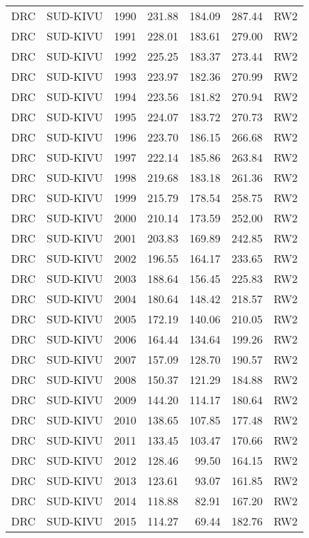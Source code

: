 \begin{longtable}{lllrrrl}
  DRC & SUD-KIVU & 1990 & 231.88 & 184.09 & 287.44 & RW2 \\ 
  DRC & SUD-KIVU & 1991 & 228.01 & 183.61 & 279.00 & RW2 \\ 
  DRC & SUD-KIVU & 1992 & 225.25 & 183.37 & 273.44 & RW2 \\ 
  DRC & SUD-KIVU & 1993 & 223.97 & 182.36 & 270.99 & RW2 \\ 
  DRC & SUD-KIVU & 1994 & 223.56 & 181.82 & 270.94 & RW2 \\ 
  DRC & SUD-KIVU & 1995 & 224.07 & 183.72 & 270.73 & RW2 \\ 
  DRC & SUD-KIVU & 1996 & 223.70 & 186.15 & 266.68 & RW2 \\ 
  DRC & SUD-KIVU & 1997 & 222.14 & 185.86 & 263.84 & RW2 \\ 
  DRC & SUD-KIVU & 1998 & 219.68 & 183.18 & 261.36 & RW2 \\ 
  DRC & SUD-KIVU & 1999 & 215.79 & 178.54 & 258.75 & RW2 \\ 
  DRC & SUD-KIVU & 2000 & 210.14 & 173.59 & 252.00 & RW2 \\ 
  DRC & SUD-KIVU & 2001 & 203.83 & 169.89 & 242.85 & RW2 \\ 
  DRC & SUD-KIVU & 2002 & 196.55 & 164.17 & 233.65 & RW2 \\ 
  DRC & SUD-KIVU & 2003 & 188.64 & 156.45 & 225.83 & RW2 \\ 
  DRC & SUD-KIVU & 2004 & 180.64 & 148.42 & 218.57 & RW2 \\ 
  DRC & SUD-KIVU & 2005 & 172.19 & 140.06 & 210.05 & RW2 \\ 
  DRC & SUD-KIVU & 2006 & 164.44 & 134.64 & 199.26 & RW2 \\ 
  DRC & SUD-KIVU & 2007 & 157.09 & 128.70 & 190.57 & RW2 \\ 
  DRC & SUD-KIVU & 2008 & 150.37 & 121.29 & 184.88 & RW2 \\ 
  DRC & SUD-KIVU & 2009 & 144.20 & 114.17 & 180.64 & RW2 \\ 
  DRC & SUD-KIVU & 2010 & 138.65 & 107.85 & 177.48 & RW2 \\ 
  DRC & SUD-KIVU & 2011 & 133.45 & 103.47 & 170.66 & RW2 \\ 
  DRC & SUD-KIVU & 2012 & 128.46 & 99.50 & 164.15 & RW2 \\ 
  DRC & SUD-KIVU & 2013 & 123.61 & 93.07 & 161.85 & RW2 \\ 
  DRC & SUD-KIVU & 2014 & 118.88 & 82.91 & 167.20 & RW2 \\ 
  DRC & SUD-KIVU & 2015 & 114.27 & 69.44 & 182.76 & RW2 \\ 

\end{longtable}
